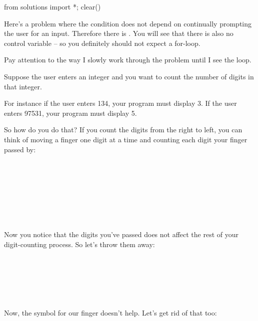 \begin{python0}
from solutions import *; clear()
\end{python0}

Here's a problem where the condition does not depend on
continually prompting the user for an input. Therefore there is
. You will see that there is also no control
variable -- so you definitely should not expect a for-loop.

Pay attention to the way I slowly work through the problem until I see
the loop.

Suppose the user enters an integer and you want to count the number of
digits in that integer.

For instance if the user enters 134, your program must display 3. If the
user enters 97531, your program must display 5.

So how do you do that? If you count the digits from the right to left,
you can think of moving a finger one digit at a time and counting each
digit your finger passed by:

\\
\\
\\
\\
\\
\\
\\

Now you notice that the digits you've passed does not
affect the rest of your digit-counting process. So let's
throw them away:\\
\\
\\
\\
\\
\\
\\

Now, the symbol for our finger doesn't help.
Let's get rid of that too:\\

